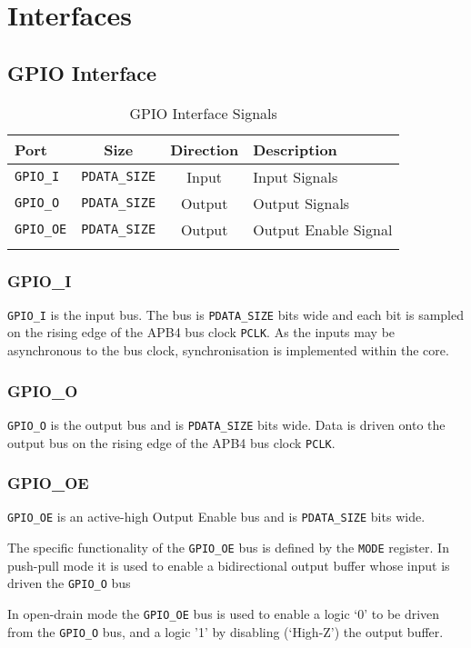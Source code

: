 \chapter{Interfaces}\label{interfaces}



\pagebreak

\section{GPIO Interface}\label{gpio-interface}

\begin{longtable}[]{@{}lccl@{}}
\toprule
Port & Size & Direction & Description\tabularnewline
\midrule
\endhead
\texttt{GPIO\_I} & \texttt{PDATA\_SIZE} & Input & Input Signals\tabularnewline
\texttt{GPIO\_O} & \texttt{PDATA\_SIZE} & Output & Output Signals\tabularnewline
\texttt{GPIO\_OE} & \texttt{PDATA\_SIZE} & Output & Output Enable Signal\tabularnewline
\bottomrule
\caption{GPIO Interface Signals}
\end{longtable}

\subsection{GPIO\_I}\label{gpio_i}

\texttt{GPIO\_I} is the input bus. The bus is \texttt{PDATA\_SIZE} bits wide and each bit
is sampled on the rising edge of the APB4 bus clock \texttt{PCLK}. As the inputs
may be asynchronous to the bus clock, synchronisation is implemented
within the core. 

\subsection{GPIO\_O}\label{gpio_o}

\texttt{GPIO\_O} is the output bus and is \texttt{PDATA\_SIZE} bits wide. Data is driven
onto the output bus on the rising edge of the APB4 bus clock \texttt{PCLK}.

\subsection{GPIO\_OE}\label{gpio_oe}

\texttt{GPIO\_OE} is an active-high Output Enable bus and is \texttt{PDATA\_SIZE} bits
wide.

The specific functionality of the \texttt{GPIO\_OE} bus is defined by the \texttt{MODE}
register. In push-pull mode it is used to enable a bidirectional output
buffer whose input is driven the \texttt{GPIO\_O} bus

In open-drain mode the \texttt{GPIO\_OE} bus is used to enable a logic `0' to be
driven from the \texttt{GPIO\_O} bus, and a logic '1' by disabling (`High-Z') the
output buffer.
